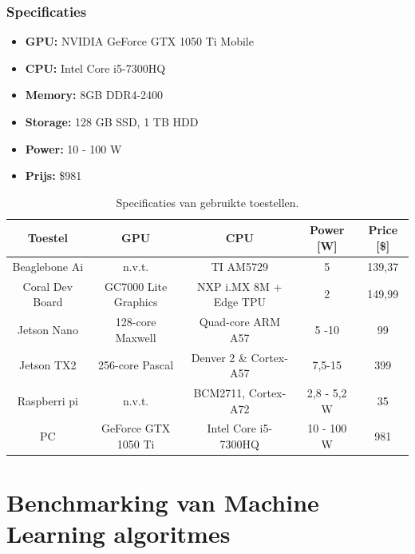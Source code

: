 	
	\subsubsection{Specificaties}
	\begin{itemize}
		\item \textbf{GPU:} NVIDIA GeForce GTX 1050 Ti Mobile
		\item \textbf{CPU:} Intel Core i5-7300HQ
		\item \textbf{Memory:} 8GB DDR4-2400
		\item \textbf{Storage:}  128 GB SSD, 1 TB HDD
		\item \textbf{Power:} 10 - 100 W
		\item \textbf{Prijs:} \$981
	\end{itemize}	
	
	
	
	\begin{table}[]
		\centering
	\begin{tabular}{ccccc}
	\hline
	Toestel                              & GPU                  & CPU                    & Power {[}W{]} & Price {[}\${]} \\ \hline
	\multicolumn{1}{c|}{Beaglebone Ai}   & n.v.t.               & TI AM5729              & 5             & 139,37         \\
	\multicolumn{1}{c|}{Coral Dev Board} & GC7000 Lite Graphics & NXP i.MX 8M + Edge TPU & 2             & 149,99         \\
	\multicolumn{1}{c|}{Jetson Nano}     & 128-core Maxwell     & Quad-core ARM A57      & 5 -10         & 99             \\
	\multicolumn{1}{c|}{Jetson TX2}      & 256-core Pascal      & Denver 2 \& Cortex-A57 & 7,5-15        & 399            \\
	\multicolumn{1}{c|}{Raspberri pi}    & n.v.t.               & BCM2711, Cortex-A72    & 2,8 - 5,2 W   & 35             \\
	\multicolumn{1}{c|}{PC}              & GeForce GTX 1050 Ti  & Intel Core i5-7300HQ   & 10 - 100 W    & 981            \\ \hline
	\end{tabular}
		\caption{Specificaties van gebruikte toestellen.}
		\label{tab:specdevices}
	\end{table}
\newpage

\section{Benchmarking van Machine Learning algoritmes}
\label{benchmark}

